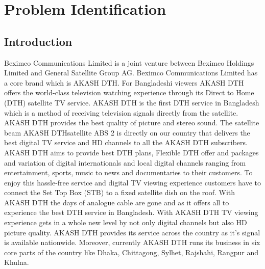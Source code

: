 \chapter{Problem Identification}
\begin{spacing}{1.5}
\setlength{\parskip}{0.3in}

\section{Introduction}
Beximco Communications Limited is a joint venture between Beximco Holdings Limited and General Satellite Group AG. Beximco Communications Limited has a core brand which is AKASH DTH. For Bangladeshi viewers AKASH DTH offers the world-class television watching experience through its Direct to Home (DTH) satellite TV service. AKASH DTH is the first DTH service in Bangladesh which is a method of receiving television signals directly from the satellite. AKASH DTH provides the best quality of picture and stereo sound. The satellite beam AKASH DTHsatellite ABS 2 is directly on our country that delivers the best digital TV service and HD channels to all the AKASH DTH subscribers. AKASH DTH aims to provide best DTH plans, Flexible DTH offer and packages and variation of digital internationals and local digital channels ranging from entertainment, sports, music to news and documentaries to their customers. To enjoy this hassle-free service and digital TV viewing experience customers have to connect the Set Top Box (STB) to a fixed satellite dish on the roof. With AKASH DTH the days of analogue cable are gone and as it offers all to experience the best DTH service in Bangladesh. With AKASH DTH TV viewing experience gets in a whole new level by not only digital channels but also HD picture quality. AKASH DTH provides its service across the country as it’s signal is available nationwide. Moreover, currently AKASH DTH runs its business in six core parts of the country like Dhaka, Chittagong, Sylhet, Rajshahi, Rangpur and Khulna.


\end{spacing}
